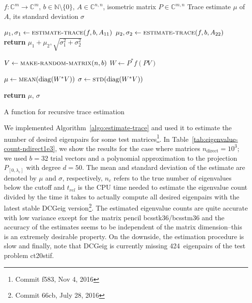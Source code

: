 \documentclass[%
	paper=a4,
	fontsize=10pt,
	DIV11,BCOR10mm,
	numbers=noenddot,
	abstract=yes
]{scrartcl}
\newcommand{\F}{\mathbb{C}}
\DeclareMathOperator{\diag}{diag}
\theoremstyle{definition}
\begin{document}
\begin{algorithm}
	\begin{algorithmic}
		\Require
			$f: \F^m \rightarrow \F^m$,
			$b \in \mathbb{N} \setminus \{0\}$,
			$A \in \F^{n,n}$,
			isometric matrix $P \in \F^{m,n}$
		\Ensure
			Trace estimate $\mu$ of $A$,
			its standard deviation $\sigma$

		\Statex
				\State $\mu_1, \sigma_1 \gets
					\textsc{estimate-trace}(f, b, A_{11})$
				\State $\mu_2, \sigma_2 \gets
					\textsc{estimate-trace}(f, b, A_{22})$
				\State
					\textbf{return} $\mu_1+\mu_2, \sqrt{\sigma_1^2+\sigma_2^2}$
			\EndIf

			\Statex
			\State $V \gets \textsc{make-random-matrix}(n, b)$
			\State $W \gets P^* f(P V)$

			\Statex
			\State $\mu \gets \textsc{mean}(\diag(W^* V))$
			\State $\sigma \gets \textsc{std}(\diag(W^* V))$

			\Statex
			\State \textbf{return} $\mu$, $\sigma$
		\EndFunction
	\end{algorithmic}
	\caption{A function for recursive trace estimation}
	\label{algo:estimate-trace}
\end{algorithm}

We implemented Algorithm~\ref{algo:estimate-trace} and used it to estimate the
number of desired eigenpairs for some test matrices\footnote{Commit f583, Nov 4,
2016}. In Table~\ref{tab:eigenvalue-count-ndirect1e3}, we show the results for
the case where matrices $n_{\text{direct}} = 10^3$; we used $b = 32$ trial
vectors and a polynomial approximation to the projection $P_{[0,\lambda_c]}$
with degree $d = 50$. The mean and standard deviation of the estimate are
denoted by $\mu$ and $\sigma$, respectively, $n_c$ refers to the true number of
eigenvalues below the cutoff and $t_{rel}$ is the CPU time needed to estimate
the eigenvalue count divided by the time it takes to actually compute all
desired eigenpairs with the latest stable DCGeig version\footnote{Commit 66cb,
July 28, 2016}. The estimated eigenvalue counts are quite accurate with low
variance except for the matrix pencil bcsstk36/bcsstm36 and the accuracy of the
estimates seems to be independent of the matrix dimension--this is an extremely
desirable property. On the downside, the estimation procedure is slow and
finally, note that DCGeig is currently missing 424~eigenpairs of the test
problem ct20stif.
\end{document}
